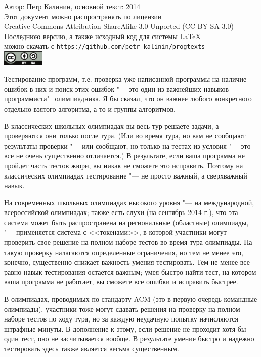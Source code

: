 \documentclass[a4paper,10pt]{problems}
\begin{document}
\begin{flushright}
Автор: Петр Калинин, основной текст: 2014\\
Этот документ можно распространять по лицензии\\
Creative Commons Attribution-ShareAlike 3.0 Unported (CC BY-SA 3.0)\\
Последнюю версию, а также исходный код для системы \LaTeX\\
можно скачать с \verb`https://github.com/petr-kalinin/progtexts`\\
\includegraphics[width=2cm]{by-sa-corr.eps}
\end{flushright}


Тестирование программ, т.е. проверка уже написанной программы на наличие ошибок в них и поиск этих ошибок "--- 
это один из важнейших навыков программиста"=олимпиадника. 
Я бы сказал, что он важнее любого конкретного отдельно взятого алгоритма, а то и группы алгоритмов.

В классических школьных олимпиадах вы весь тур решаете задачи, а проверяются они только после тура. 
(Или во время тура, но вам не сообщают результаты проверки "--- или сообщают, но только на тестах из условия "--- это все не очень существенно отличается.) 
В результате, если ваша программа не пройдет часть тестов жюри, вы никак не сможете это исправить. 
Поэтому на классических олимпиадах тестирование "--- не просто важный, а сверхважный навык.

На современных школьных олимпиадах высокого уровня "--- на международной, всероссийской олимпиадах; также есть слухи (на сентябрь 2014 г.), 
что эта система может быть распространена на региональные (областные) олимпиады, "--- применяется система с <<токенами>>, 
в которой участники могут проверить свое решение на полном наборе тестов во время тура олимпиады.
На такую проверку налагаются определенные ограничения, но тем не менее это, конечно, существенно снижает важность умения тестировать.
Тем не менее все равно навык тестирования остается важным; умея быстро найти тест, на котором ваша программа не работает, вы сможете все ошибки
и исправить быстрее.

В олимпиадах, проводимых по стандарту ACM (это в первую очередь командные олимпиады), участники тоже могут сдавать решения на проверку на полном наборе тестов по ходу тура, но за каждую неудачную попытку начисляются штрафные минуты. 
В дополнение к этому, если решение не проходит хотя бы один тест, оно не засчитывается вообще. 
В результате умение быстро и надежно тестировать здесь также является весьма существенным.
\end{document}
